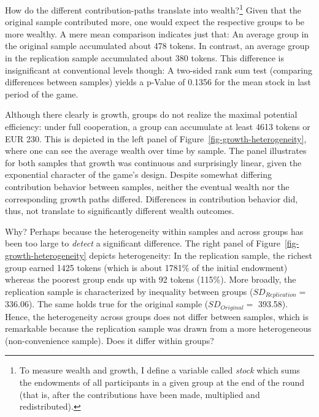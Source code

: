 \documentclass[
  authoryear,
  preprint,
  3p]{elsarticle}
\begin{document}
How do the different contribution-paths translate into
wealth?\footnote{To measure wealth and growth, I define a variable
  called \emph{stock} which sums the endowments of all participants in a
  given group at the end of the round (that is, after the contributions
  have been made, multiplied and redistributed).} Given that the
original sample contributed more, one would expect the respective groups
to be more wealthy. A mere mean comparison indicates just that: An
average group in the original sample accumulated about 478 tokens. In
contrast, an average group in the replication sample accumulated about
380 tokens. This difference is insignificant at conventional levels
though: A two-sided rank sum test (comparing differences between
samples) yields a p-Value of 0.1356 for the mean stock in last period of
the game.

Although there clearly is growth, groups do not realize the maximal
potential efficiency: under full cooperation, a group can accumulate at
least 4613 tokens or EUR 230. This is depicted in the left panel of
Figure~\ref{fig-growth-heterogeneity}, where one can see the average
wealth over time by sample. The panel illustrates for both samples that
growth was continuous and surprisingly linear, given the exponential
character of the game's design. Despite somewhat differing contribution
behavior between samples, neither the eventual wealth nor the
corresponding growth paths differed. Differences in contribution
behavior did, thus, not translate to significantly different wealth
outcomes.

Why? Perhaps because the heterogeneity within samples and across groups
has been too large to \emph{detect} a significant difference. The right
panel of Figure~\ref{fig-growth-heterogeneity} depicts heterogeneity: In
the replication sample, the richest group earned 1425 tokens (which is
about 1781\% of the initial endowment) whereas the poorest group ends up
with 92 tokens (115\%). More broadly, the replication sample is
characterized by inequality between groups (\(SD_{Replication} =\)
336.06). The same holds true for the original sample
(\(SD_{Original} =\) 393.58). Hence, the heterogeneity across groups
does not differ between samples, which is remarkable because the
replication sample was drawn from a more heterogeneous (non-convenience
sample). Does it differ within groups?
\end{document}
